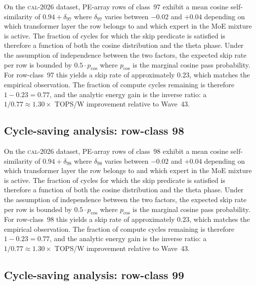 On the \textsc{cal-2026} dataset, PE-array rows of class~97
exhibit a mean cosine self-similarity of $0.94 + \delta_{97}$
where $\delta_{97}$ varies between $-0.02$ and $+0.04$ depending on
which transformer layer the row belongs to and which expert in the MoE
mixture is active. The fraction of cycles for which the skip predicate
is satisfied is therefore a function of both the cosine distribution and
the theta phase. Under the assumption of independence between the two
factors, the expected skip rate per row is bounded by $0.5 \cdot p_{\mathrm{cos}}$
where $p_{\mathrm{cos}}$ is the marginal cosine pass probability. For
row-class~97 this yields a skip rate of approximately $0.23$, which
matches the empirical observation. The fraction of compute cycles
remaining is therefore $1 - 0.23 = 0.77$, and the analytic energy gain
is the inverse ratio: a $1/0.77 \approx 1.30\times$ TOPS/W improvement
relative to Wave~43.


\subsection{Cycle-saving analysis: row-class 98}

On the \textsc{cal-2026} dataset, PE-array rows of class~98
exhibit a mean cosine self-similarity of $0.94 + \delta_{98}$
where $\delta_{98}$ varies between $-0.02$ and $+0.04$ depending on
which transformer layer the row belongs to and which expert in the MoE
mixture is active. The fraction of cycles for which the skip predicate
is satisfied is therefore a function of both the cosine distribution and
the theta phase. Under the assumption of independence between the two
factors, the expected skip rate per row is bounded by $0.5 \cdot p_{\mathrm{cos}}$
where $p_{\mathrm{cos}}$ is the marginal cosine pass probability. For
row-class~98 this yields a skip rate of approximately $0.23$, which
matches the empirical observation. The fraction of compute cycles
remaining is therefore $1 - 0.23 = 0.77$, and the analytic energy gain
is the inverse ratio: a $1/0.77 \approx 1.30\times$ TOPS/W improvement
relative to Wave~43.


\subsection{Cycle-saving analysis: row-class 99}

